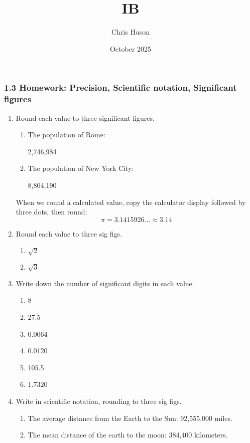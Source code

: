 \documentclass[12pt, twoside]{article}
\title{IB}
\author{Chris Huson}
\date{October 2025}
\begin{document}
\subsubsection*{1.3 Homework: Precision, Scientific notation, Significant figures}

\begin{enumerate}[itemsep=0.5cm]
\item Round each value to three significant figures.
  \begin{multicols}{2}
    \begin{enumerate}[itemsep=0.5cm]
      \item The population of Rome: \par 2,746,984
      \item The population of New York City: \par 8,804,190
    \end{enumerate}
  \end{multicols}

When we round a calculated value, copy the calculator display followed by three dots, then round: $$\pi = 3.1415926\ldots \approx 3.14$$

\item Round each value to three sig figs.
  \begin{multicols}{2}
    \begin{enumerate}[itemsep=0.5cm]
      \item $\sqrt{2}$
      \item $\sqrt{3}$
    \end{enumerate}
  \end{multicols} \vspace{0.5cm}

\item Write down the number of significant digits in each value.
  \begin{multicols}{3}
    \begin{enumerate}[itemsep=0.5cm]
      \item 8
      \item 27.5
      \item 0.0064
      \item 0.0120
      \item 105.5
      \item 1.7320
    \end{enumerate}
  \end{multicols} \vspace{0.25cm}

\item Write in scientific notation, rounding to three sig figs.
  \begin{multicols}{2}
    \begin{enumerate}[itemsep=1cm]
      \item The average distance from the Earth to the Sun: 92,555,000 miles.
      \item The mean distance of the earth to the moon: 384,400 kilometers.
    \end{enumerate}
  \end{multicols} \vspace{2cm}


\end{enumerate}
\end{document}
